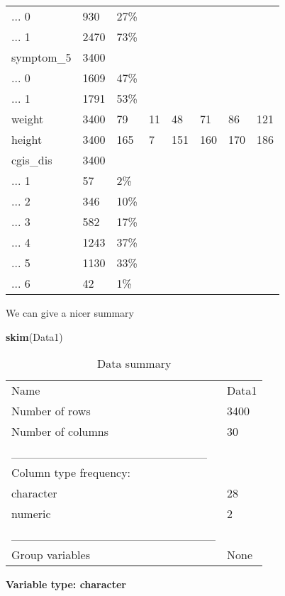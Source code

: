 \documentclass[
]{article}
\newenvironment{Shaded}{\begin{snugshade}}{\end{snugshade}}
\newcommand{\FunctionTok}[1]{\textcolor[rgb]{0.13,0.29,0.53}{\textbf{#1}}}
\newcommand{\NormalTok}[1]{#1}
\begin{document}
\begin{table}
\begin{tabular}[t]{llllllll}
... 0 & 930 & 27\% &  &  &  &  & \\
... 1 & 2470 & 73\% &  &  &  &  & \\
symptom\_5 & 3400 &  &  &  &  &  & \\
\addlinespace
... 0 & 1609 & 47\% &  &  &  &  & \\
... 1 & 1791 & 53\% &  &  &  &  & \\
weight & 3400 & 79 & 11 & 48 & 71 & 86 & 121\\
height & 3400 & 165 & 7 & 151 & 160 & 170 & 186\\
cgis\_dis & 3400 &  &  &  &  &  & \\
\addlinespace
... 1 & 57 & 2\% &  &  &  &  & \\
... 2 & 346 & 10\% &  &  &  &  & \\
... 3 & 582 & 17\% &  &  &  &  & \\
... 4 & 1243 & 37\% &  &  &  &  & \\
... 5 & 1130 & 33\% &  &  &  &  & \\
\addlinespace
... 6 & 42 & 1\% &  &  &  &  & \\
\bottomrule
\end{tabular}
\end{table}

We can give a nicer summary

\begin{Shaded}
\begin{Highlighting}[]
\FunctionTok{skim}\NormalTok{(Data1)}
\end{Highlighting}
\end{Shaded}

\begin{longtable}[]{@{}ll@{}}
\caption{Data summary}\tabularnewline
\toprule\noalign{}
\endfirsthead
\endhead
\bottomrule\noalign{}
\endlastfoot
Name & Data1 \\
Number of rows & 3400 \\
Number of columns & 30 \\
\_\_\_\_\_\_\_\_\_\_\_\_\_\_\_\_\_\_\_\_\_\_\_ & \\
Column type frequency: & \\
character & 28 \\
numeric & 2 \\
\_\_\_\_\_\_\_\_\_\_\_\_\_\_\_\_\_\_\_\_\_\_\_\_ & \\
Group variables & None \\
\end{longtable}

\textbf{Variable type: character}
\end{document}
